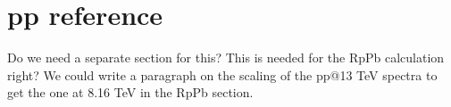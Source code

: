 \section{pp reference}\label{section:ppreference}
{\color{red} Do we need a separate section for this? This is needed for the RpPb calculation right? We could write a paragraph on the scaling of the pp@13 TeV spectra to get the one at 8.16 TeV in the RpPb section.}